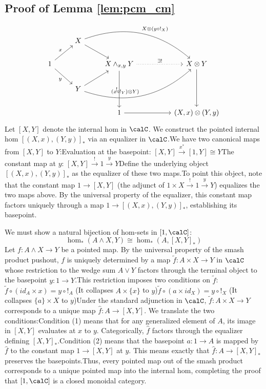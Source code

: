 \documentclass[12pt,oneside,pb-diagram]{article}
\begin{document}
\subsection{Proof of Lemma \ref{lem:pcm_cm}} \label{sec:proof:pcm_cm}
%
\[\begin{tikzcd}
	& X \arrow[rd] \arrow[rrrd, "X \otimes (y\circ !_X)", bend left] &  &  &  \\
	1 \arrow[ru, "x"] \arrow[rd, "y"'] &  & X \wedge_{x,y} Y \arrow[rr, "\exists !", dotted] \arrow[dd, "!"'] &  & X\otimes Y \arrow[dd] \\
	& Y \arrow[ru] \arrow[rrru, "(x\circ !_Y) \otimes Y)", bend right] &  &  &  \\
	&  & 1 \arrow[rr] &  & (X,x) \otimes (Y,y)
\end{tikzcd}\]
%
Let $[X, Y]$ denote the internal hom in $\calC$. We construct the pointed internal hom $[(X, x), (Y, y)]_*$ via an equalizer in $\calC$.We have two canonical maps from $[X, Y]$ to $Y$:Evaluation at the basepoint: $[X, Y] \xrightarrow{x^*} [1, Y] \cong Y$The constant map at $y$: $[X, Y] \xrightarrow{!} 1 \xrightarrow{y} Y$Define the underlying object $[(X, x), (Y, y)]_*$ as the equalizer of these two maps.To point this object, note that the constant map $1 \to [X, Y]$ (the adjunct of $1 \times X \xrightarrow{!} 1 \xrightarrow{y} Y$) equalizes the two maps above. By the universal property of the equalizer, this constant map factors uniquely through a map $1 \to [(X, x), (Y, y)]_*$, establishing its basepoint.

We must show a natural bijection of hom-sets in $[1, \calC]$:$$\hom_*(A \wedge X, Y) \cong \hom_*(A, [X, Y]_*)$$Let $f: A \wedge X \to Y$ be a pointed map. By the universal property of the smash product pushout, $f$ is uniquely determined by a map $\tilde{f}: A \times X \to Y$ in $\calC$ whose restriction to the wedge sum $A \vee Y$ factors through the terminal object to the basepoint $y: 1 \to Y$.This restriction imposes two conditions on $\tilde{f}$:$\tilde{f} \circ (id_A \times x) = y \circ !_A$ (It collapses $A \times \{x\}$ to $y$)$\tilde{f} \circ (a \times id_X) = y \circ !_X$ (It collapses $\{a\} \times X$ to $y$)Under the standard adjunction in $\calC$, $\tilde{f}: A \times X \to Y$ corresponds to a unique map $\hat{f}: A \to [X, Y]$. We translate the two conditions:Condition (1) means that for any generalized element of $A$, its image in $[X, Y]$ evaluates at $x$ to $y$. Categorically, $\hat{f}$ factors through the equalizer defining $[X, Y]_*$.Condition (2) means that the basepoint $a: 1 \to A$ is mapped by $\hat{f}$ to the constant map $1 \to [X, Y]$ at $y$. This means exactly that $\hat{f}: A \to [X, Y]_*$ preserves the basepoints.Thus, every pointed map out of the smash product corresponds to a unique pointed map into the internal hom, completing the proof that $[1, \calC]$ is a closed monoidal category.
\end{document}
